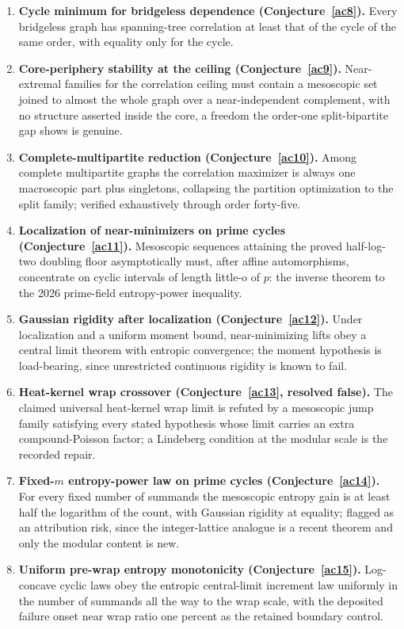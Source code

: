 \documentclass[11pt]{article}
\theoremstyle{definition}
\begin{document}
\begin{enumerate}
\item \textbf{Cycle minimum for bridgeless dependence (Conjecture~\ref{ac8}).}  Every bridgeless graph has spanning-tree correlation at least that of the cycle of the same order, with equality only for the cycle.
\item \textbf{Core-periphery stability at the ceiling (Conjecture~\ref{ac9}).}  Near-extremal families for the correlation ceiling must contain a mesoscopic set joined to almost the whole graph over a near-independent complement, with no structure asserted inside the core, a freedom the order-one split-bipartite gap shows is genuine.
\item \textbf{Complete-multipartite reduction (Conjecture~\ref{ac10}).}  Among complete multipartite graphs the correlation maximizer is always one macroscopic part plus singletons, collapsing the partition optimization to the split family; verified exhaustively through order forty-five.
\item \textbf{Localization of near-minimizers on prime cycles (Conjecture~\ref{ac11}).}  Mesoscopic sequences attaining the proved half-log-two doubling floor asymptotically must, after affine automorphisms, concentrate on cyclic intervals of length little-o of $p$: the inverse theorem to the 2026 prime-field entropy-power inequality.
\item \textbf{Gaussian rigidity after localization (Conjecture~\ref{ac12}).}  Under localization and a uniform moment bound, near-minimizing lifts obey a central limit theorem with entropic convergence; the moment hypothesis is load-bearing, since unrestricted continuous rigidity is known to fail.
\item \textbf{Heat-kernel wrap crossover (Conjecture~\ref{ac13}, resolved false).}  The claimed universal heat-kernel wrap limit is refuted by a mesoscopic jump family satisfying every stated hypothesis whose limit carries an extra compound-Poisson factor; a Lindeberg condition at the modular scale is the recorded repair.
\item \textbf{Fixed-$m$ entropy-power law on prime cycles (Conjecture~\ref{ac14}).}  For every fixed number of summands the mesoscopic entropy gain is at least half the logarithm of the count, with Gaussian rigidity at equality; flagged as an attribution risk, since the integer-lattice analogue is a recent theorem and only the modular content is new.
\item \textbf{Uniform pre-wrap entropy monotonicity (Conjecture~\ref{ac15}).}  Log-concave cyclic laws obey the entropic central-limit increment law uniformly in the number of summands all the way to the wrap scale, with the deposited failure onset near wrap ratio one percent as the retained boundary control.

\end{enumerate}
\end{document}
